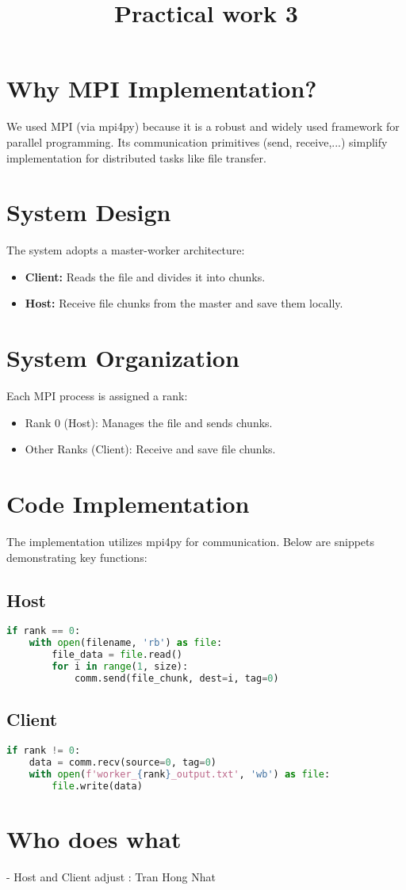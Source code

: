 \documentclass{article}
\title{Practical work 3}
\author{}
\date{}
\begin{document}
\maketitle


\section{Why MPI Implementation?}
We used MPI (via mpi4py) because it is a robust and widely used framework for parallel programming. Its communication primitives (send, receive,...) simplify implementation for distributed tasks like file transfer.

\section{System Design}
The system adopts a master-worker architecture:
\begin{itemize}
    \item \textbf{Client:} Reads the file and divides it into chunks.
    \item \textbf{Host:} Receive file chunks from the master and save them locally.
\end{itemize}

\section{System Organization}
Each MPI process is assigned a rank:
\begin{itemize}
    \item Rank 0 (Host): Manages the file and sends chunks.
    \item Other Ranks (Client): Receive and save file chunks.
\end{itemize}


\section{Code Implementation}
The implementation utilizes mpi4py for communication. Below are snippets demonstrating key functions:

\subsection{Host}
\begin{lstlisting}[language=Python]
if rank == 0:
    with open(filename, 'rb') as file:
        file_data = file.read()
        for i in range(1, size):
            comm.send(file_chunk, dest=i, tag=0)
\end{lstlisting}

\subsection{Client}
\begin{lstlisting}[language=Python]
if rank != 0:
    data = comm.recv(source=0, tag=0)
    with open(f'worker_{rank}_output.txt', 'wb') as file:
        file.write(data)
\end{lstlisting}

\section{Who does what}
- Host and Client adjust : Tran Hong Nhat
\end{document}
